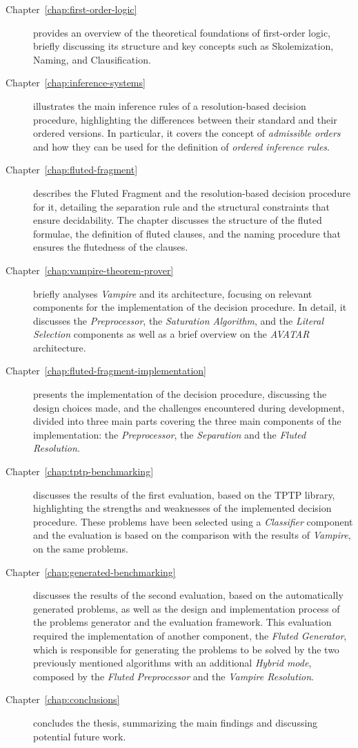 \begin{description}
    \item[Chapter~\ref{chap:first-order-logic}] provides an overview of the theoretical foundations of first-order logic, briefly discussing its structure and key concepts such as Skolemization, Naming, and Clausification.
    \item[Chapter~\ref{chap:inference-systems}] illustrates the main inference rules of a resolution-based decision procedure, highlighting the differences between their standard and their ordered versions. In particular, it covers the concept of \emph{admissible orders} and how they can be used for the definition of \emph{ordered inference rules}.
    \item[Chapter~\ref{chap:fluted-fragment}] describes the Fluted Fragment and the resolution-based decision procedure for it, detailing the separation rule and the structural constraints that ensure decidability. The chapter discusses the structure of the fluted formulae, the definition of fluted clauses, and the naming procedure that ensures the flutedness of the clauses.
    \item[Chapter~\ref{chap:vampire-theorem-prover}] briefly analyses \emph{Vampire} and its architecture, focusing on relevant components for the implementation of the decision procedure. In detail, it discusses the \emph{Preprocessor}, the \emph{Saturation Algorithm}, and the \emph{Literal Selection} components as well as a brief overview on the \emph{AVATAR} architecture.
    \item[Chapter~\ref{chap:fluted-fragment-implementation}] presents the implementation of the decision procedure, discussing the design choices made, and the challenges encountered during development, divided into three main parts covering the three main components of the implementation: the \emph{Preprocessor}, the \emph{Separation} and the \emph{Fluted Resolution}.
    \item[Chapter~\ref{chap:tptp-benchmarking}] discusses the results of the first evaluation, based on the TPTP library, highlighting the strengths and weaknesses of the implemented decision procedure. These problems have been selected using a \emph{Classifier} component and the evaluation is based on the comparison with the results of \emph{Vampire}, on the same problems.
    \item[Chapter~\ref{chap:generated-benchmarking}] discusses the results of the second evaluation, based on the automatically generated problems, as well as the design and implementation process of the problems generator and the evaluation framework. This evaluation required the implementation of another component, the \emph{Fluted Generator}, which is responsible for generating the problems to be solved by the two previously mentioned algorithms with an additional \emph{Hybrid mode}, composed by the \emph{Fluted Preprocessor} and the \emph{Vampire Resolution}.
    \item[Chapter~\ref{chap:conclusions}] concludes the thesis, summarizing the main findings and discussing potential future work.
\end{description}



